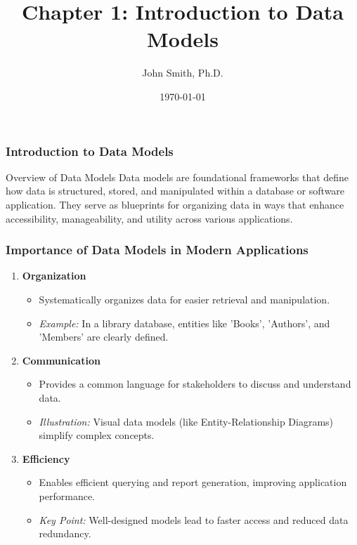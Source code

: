 \documentclass[aspectratio=169]{beamer}
\title[Introduction to Data Models]{Chapter 1: Introduction to Data Models}
\author[J. Smith]{John Smith, Ph.D.}
\institute[University Name]{
  Department of Computer Science\\
  University Name\\
  \vspace{0.3cm}
  Email: email@university.edu\\
  Website: www.university.edu
}
\date{\today}
\begin{document}
\frame{\titlepage}

\begin{frame}[fragile]
    \frametitle{Introduction to Data Models}
    \begin{block}{Overview of Data Models}
        Data models are foundational frameworks that define how data is structured, stored, and manipulated within a database or software application. They serve as blueprints for organizing data in ways that enhance accessibility, manageability, and utility across various applications.
    \end{block}
\end{frame}

\begin{frame}[fragile]
    \frametitle{Importance of Data Models in Modern Applications}
    \begin{enumerate}
        \item \textbf{Organization}
            \begin{itemize}
                \item Systematically organizes data for easier retrieval and manipulation.
                \item \textit{Example:} In a library database, entities like 'Books', 'Authors', and 'Members' are clearly defined.
            \end{itemize}
        
        \item \textbf{Communication}
            \begin{itemize}
                \item Provides a common language for stakeholders to discuss and understand data.
                \item \textit{Illustration:} Visual data models (like Entity-Relationship Diagrams) simplify complex concepts.
            \end{itemize}
        
        \item \textbf{Efficiency}
            \begin{itemize}
                \item Enables efficient querying and report generation, improving application performance.
                \item \textit{Key Point:} Well-designed models lead to faster access and reduced data redundancy.
            \end{itemize}
    \end{enumerate}
\end{frame}
\end{document}
